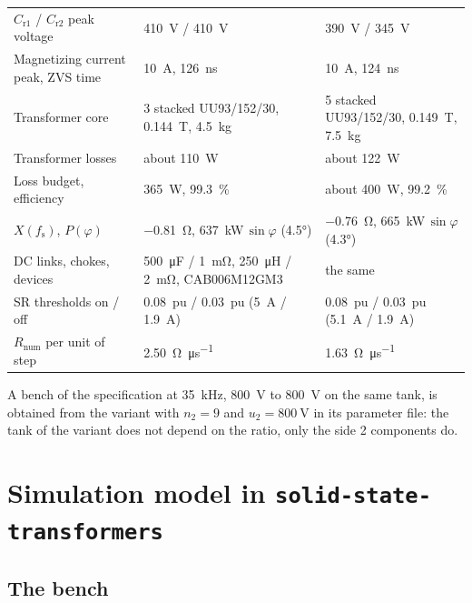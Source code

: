 \documentclass[12pt,a4paper]{scrartcl}
\newcommand{\ped}[1]{_{\mathrm{#1}}}
\newcommand{\code}[1]{\texttt{#1}}
\begin{document}
\begin{onehalfspace}
\begin{table}[H]
\begin{tabularx}{0.97\textwidth}{@{} >{\raggedright\arraybackslash}p{} X X @{}}
		$C\ped{r1}$ / $C\ped{r2}$ peak voltage & \SI{410}{\volt} / \SI{410}{\volt} & \SI{390}{\volt} / \SI{345}{\volt} \\
		Magnetizing current peak, ZVS time & \SI{10}{\ampere}, \SI{126}{\nano\second} & \SI{10}{\ampere}, \SI{124}{\nano\second} \\
		Transformer core & 3 stacked UU93/152/30, \SI{0.144}{\tesla}, \SI{4.5}{\kilogram} & 5 stacked UU93/152/30, \SI{0.149}{\tesla}, \SI{7.5}{\kilogram} \\
		Transformer losses & about \SI{110}{\watt} & about \SI{122}{\watt} \\
		Loss budget, efficiency & \SI{365}{\watt}, \SI{99.3}{\percent} & about \SI{400}{\watt}, \SI{99.2}{\percent} \\
		$X(f\ped{s})$, $P(\varphi)$ & \SI{-0.81}{\ohm}, \SI{637}{\kilo\watt}$\,\sin\varphi$ (\ang{4.5}) & \SI{-0.76}{\ohm}, \SI{665}{\kilo\watt}$\,\sin\varphi$ (\ang{4.3}) \\
		DC links, chokes, devices & \SI{500}{\micro\farad} / \SI{1}{\milli\ohm}, \SI{250}{\micro\henry} / \SI{2}{\milli\ohm}, CAB006M12GM3 & the same \\
		SR thresholds on / off & \SI{0.08}{pu} / \SI{0.03}{pu} (\SI{5}{\ampere} / \SI{1.9}{\ampere}) & \SI{0.08}{pu} / \SI{0.03}{pu} (\SI{5.1}{\ampere} / \SI{1.9}{\ampere}) \\
		$R\ped{num}$ per unit of step & \SI{2.50}{\ohm\per\micro\second} & \SI{1.63}{\ohm\per\micro\second} \\
		\bottomrule
	\end{tabularx}
\end{table}

A bench of the specification at \SI{35}{\kilo\hertz}, \SI{800}{\volt} to \SI{800}{\volt} on the same tank, is obtained from the variant with $n\ped{2} = 9$ and $u\ped{2} = \SI{800}{\volt}$ in its parameter file: the tank of the variant does not depend on the ratio, only the side 2 components do.

\section{Simulation model in \code{solid-state-transformers}}
\label{sec:model}

\subsection{The bench}
\label{sec:bench}


\end{onehalfspace}
\end{document}
